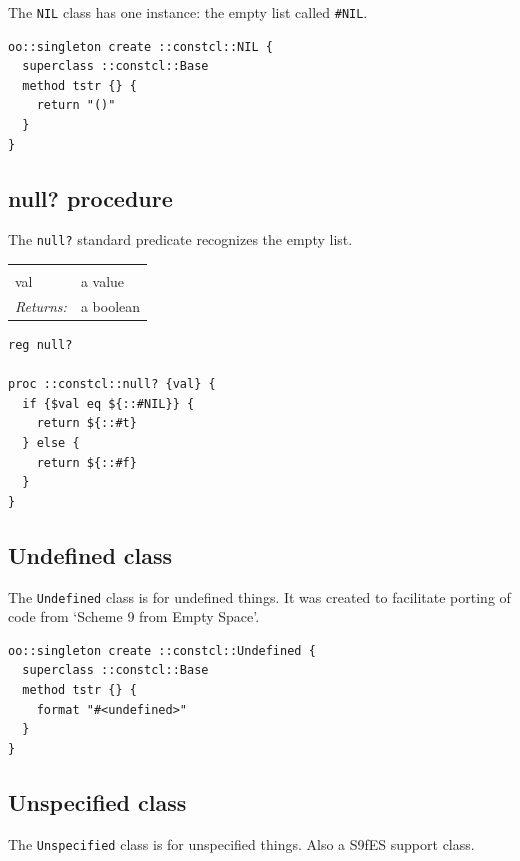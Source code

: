 \documentclass[twoside]{report}
\begin{document}
The \texttt{NIL} class has one instance: the empty list called \texttt{\#NIL}.

\begin{lstlisting}
oo::singleton create ::constcl::NIL {
  superclass ::constcl::Base
  method tstr {} {
    return "()"
  }
}
\end{lstlisting}

\subsection{null? procedure}
\label{null-procedure}

The \texttt{null?} standard predicate recognizes the empty list.

\noindent\begin{tabular}{ |p{1.9cm} p{8cm}| }
\hline
\rowcolor[HTML]{CCCCCC} \multicolumn{2}{|l|}{\bf null? (public)} \\
val & a value \\
\textit{Returns:} & a boolean \\
\hline
\end{tabular}

\begin{lstlisting}
reg null?

proc ::constcl::null? {val} {
  if {$val eq ${::#NIL}} {
    return ${::#t}
  } else {
    return ${::#f}
  }
}
\end{lstlisting}

\subsection{Undefined class}
\label{undefined-class}

The \texttt{Undefined} class is for undefined things. It was created to facilitate porting of code from `Scheme 9 from Empty Space'.

\begin{lstlisting}
oo::singleton create ::constcl::Undefined {
  superclass ::constcl::Base
  method tstr {} {
    format "#<undefined>"
  }
}
\end{lstlisting}

\subsection{Unspecified class}
\label{unspecified-class}

The \texttt{Unspecified} class is for unspecified things. Also a S9fES support class.
\end{document}
